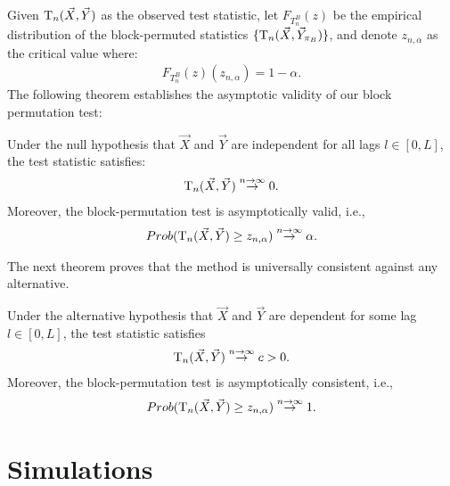 Given $\mathrm{T}_{n}(\vec{X}, \vec{Y})$ as the observed test statistic, let $F_{T_{n}^{B}}(z)$ be the empirical distribution of the block-permuted statistics $\{\mathrm{T}_{n}(\vec{X}, \vec{Y}_{\pi_{B}})\}$, and denote $z_{n, \alpha}$ as the critical value where:
\begin{align*}
F_{T_{n}^{B}}(z)(z_{n,\alpha})=1-\alpha.
\end{align*}
The following theorem establishes the asymptotic validity of our block permutation test:
\begin{theorem}
    \label{thm:valid}
    Under the null hypothesis that $\vec{X}$ and $\vec{Y}$ are independent for all lags $l \in [0,L]$, the test statistic satisfies:
    \begin{align*}
       \mathrm{T}_{n}(\vec{X}, \vec{Y}) \stackrel{n\rightarrow \infty}{\rightarrow} 0.
       \end{align*}
    Moreover, the block-permutation test is asymptotically valid, i.e., 
    \begin{align*}
       Prob(\mathrm{T}_{n}(\vec{X}, \vec{Y}) \geq z_{n,\alpha}) \stackrel{n\rightarrow \infty}{\rightarrow} \alpha.
       \end{align*}
\end{theorem}

The next theorem proves that the method is universally consistent against any alternative.

\begin{theorem}
    \label{thm:consistent}
     Under the alternative hypothesis that $\vec{X}$ and $\vec{Y}$ are dependent for some lag $l \in [0,L]$, the test statistic satisfies 
    \begin{align*}
       \mathrm{T}_{n}(\vec{X}, \vec{Y}) \stackrel{n\rightarrow \infty}{\rightarrow} c>0.
       \end{align*}
    Moreover, the block-permutation test is asymptotically consistent, i.e., 
    \begin{align*}
       Prob(\mathrm{T}_{n}(\vec{X}, \vec{Y}) \geq z_{n,\alpha}) \stackrel{n\rightarrow \infty}{\rightarrow} 1.
       \end{align*}
\end{theorem}

\section{Simulations}
\label{sec:sims}

